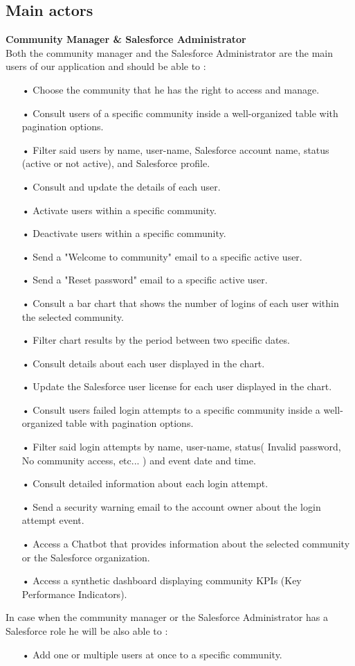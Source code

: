 \subsection*{Main actors}
\textbf{Community Manager \& Salesforce Administrator}\\
Both the community manager and the Salesforce Administrator are the main users of our application and should be able to :
\begin{itemize}
\item[•] Choose the community that he has the right to access and manage.
\item[•] Consult users of a specific community inside a well-organized table with pagination options.
\item[•] Filter said users by name, user-name, Salesforce account name, status (active or not active), and Salesforce profile.
\item[•] Consult and update the details of each user.
\item[•] Activate users within a specific community.
\item[•] Deactivate users within a specific community.
\item[•] Send a "Welcome to community" email to a specific active user.
\item[•] Send a "Reset password" email to a specific active user.
\item[•] Consult a bar chart that shows the number of logins of each user within the selected community.
\item[•] Filter chart results by the period between two specific dates.
\item[•] Consult details about each user displayed in the chart.
\item[•] Update the Salesforce user license for each user displayed in the chart.
\item[•] Consult users failed login attempts to a specific community inside a well-organized table with pagination options.
\item[•] Filter said login attempts by name, user-name, status( Invalid password, No community access, etc... ) and event date and time.
\item[•] Consult detailed information about each login attempt.
\item[•] Send a security warning email to the account owner about the login attempt event.
\item[•] Access a Chatbot that provides information about the selected community or the Salesforce organization.
\item[•] Access a synthetic dashboard displaying community KPIs (Key Performance Indicators).

\end{itemize}
In case when the community manager or the Salesforce Administrator has a Salesforce role he will be also able to :
\begin{itemize}
\item[•] Add one or multiple users at once to a specific community.
\end{itemize}


